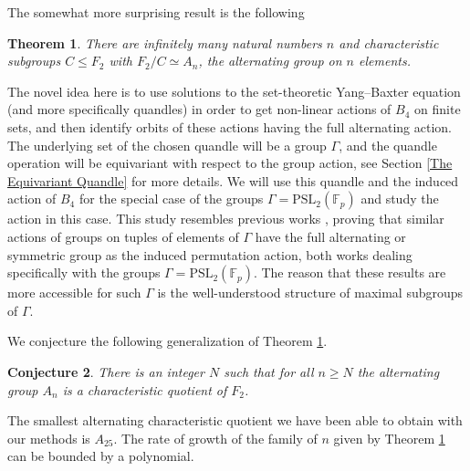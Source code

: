 \documentclass[letterpaper]{amsart}
\newtheorem{theorem}{Theorem}[section]
\newtheorem{conjecture}[theorem]{Conjecture}
\begin{document}
The somewhat more surprising result is the following
\begin{theorem}
\label{Alternating quotients}
There are infinitely many natural numbers $n$ and characteristic subgroups $C \leq F_2$ with $F_2 / C \simeq A_n$, the alternating group on $n$ elements.
\end{theorem}
The novel idea here is to use solutions to the set-theoretic Yang--Baxter equation (and more specifically quandles) in order to get non-linear actions of $B_4$ on finite sets, and then identify orbits of these actions having the full alternating action.
The underlying set of the chosen quandle will be a group $\Gamma$, and the quandle operation will be equivariant with respect to the group action, see Section \ref{The Equivariant Quandle} for more details. We will use this quandle and the induced action of $B_4$ for the special case of the groups $\Gamma = \mathrm{PSL}_2(\mathbb{F}_p)$ and study the action in this case. This study resembles previous works \cite{gilman1977finite}, \cite{meiri2018markoff} proving that similar actions of groups on tuples of elements of $\Gamma$ have the full alternating or symmetric group as the induced permutation action, both works dealing specifically with the groups $\Gamma = \mathrm{PSL}_2(\mathbb{F}_p)$. The reason that these results are more accessible for such $\Gamma$ is the well-understood structure of maximal subgroups of $\Gamma$.

We conjecture the following generalization of Theorem \ref{Alternating quotients}.
\begin{conjecture}
    There is an integer $N$ such that for all $n \geq N$ the alternating group $A_n$ is a characteristic quotient of $F_2$.
\end{conjecture}
The smallest alternating characteristic quotient we have been able to obtain with our methods is $A_{25}$. The rate of growth of the family of $n$ given by Theorem \ref{Alternating quotients} can be bounded by a polynomial.
\end{document}
